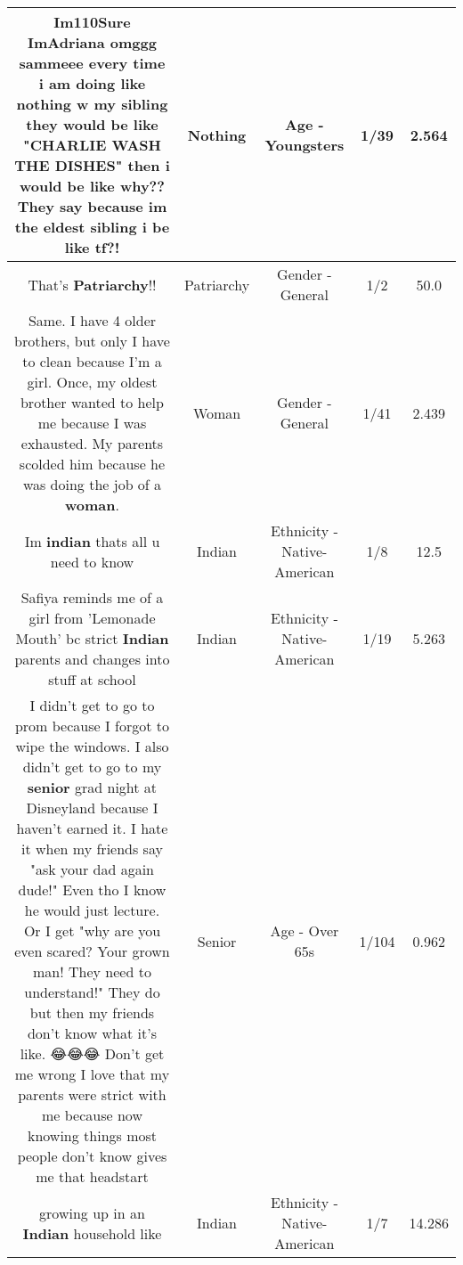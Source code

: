 \documentclass[11pt]{article}
\newlength\mylength
\begin{document}
\begin{center}
\begin{longtable}{|C{.65\mylength}|C{.30\mylength}|C{.12\mylength}|C{.12\mylength}|C{.12\mylength}|}
  \small Im110Sure ImAdriana omggg sammeee every time i am doing like \textbf{nothing} w my sibling they would be like "CHARLIE WASH THE DISHES" then i would be like why?? They say because im the eldest sibling i be like tf?!\normalsize   & Nothing & Age - Youngsters & 1/39 & 2.564 \\  \hline
  \small That's \textbf{Patriarchy}!!\normalsize   & Patriarchy & Gender - General & 1/2 & 50.0 \\  \hline
  \small Same. I have 4 older brothers, but only I have to clean because I'm a girl. Once, my oldest brother wanted to help me because I was exhausted. My parents scolded him because he was doing the job of a \textbf{woman}.\normalsize   & Woman & Gender - General & 1/41 & 2.439 \\  \hline
  \small Im \textbf{indian} thats all u need to know\normalsize   & Indian & Ethnicity - Native-American & 1/8 & 12.5 \\  \hline
  \small Safiya reminds me of a girl from 'Lemonade Mouth' bc strict \textbf{Indian} parents and changes into stuff at school\normalsize   & Indian & Ethnicity - Native-American & 1/19 & 5.263 \\  \hline
  \small I didn't get to go to prom because I forgot to wipe the windows. I also didn't get to go to my \textbf{senior} grad night at Disneyland because I haven't earned it. I hate it when my friends say "ask your dad again dude!" Even tho I know he would just lecture. Or I get "why are you even scared? Your grown man! They need to understand!" They do but then my friends don't know what it's like. 😂😂😂 Don't get me wrong I love that my parents were strict with me because now knowing things most people don't know gives me that headstart\normalsize   & Senior & Age - Over 65s & 1/104 & 0.962 \\  \hline
  \small growing up in an \textbf{Indian} household like\normalsize   & Indian & Ethnicity - Native-American & 1/7 & 14.286 \\  \hline

\end{longtable}
\end{center}
\end{document}
